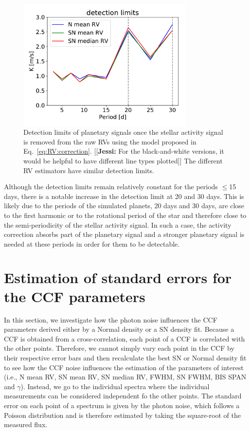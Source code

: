 \documentclass{aa}
\newcommand{\jessi}[1]{{\color{Purple}[[\textbf{Jessi: }#1]]}}
\begin{document}
\begin{figure}[!h]
\begin{center}
\includegraphics[height = 2.6in]{detection_limits.pdf} 
   \caption{Detection limits of planetary signals once the stellar activity signal is removed from the raw RVs using the model proposed in  Eq.~\ref{eq:RV:correction}. \jessi{For the black-and-white versions, it would be helpful to have different line types plotted}
The different RV estimators have similar detection limits.}
   \label{fig:detection_limits}
\end{center}
\end{figure}

Although the detection limits remain relatively constant for the periods  $\leq$15 days, there is a notable increase in the detection limit at 20 and 30 days. 
This is likely due to the periods of the simulated planets, 20 days and 30 days, are close to the first harmonic or to the rotational period of the star \citep[36.7 days,][]{Dumusque-2012}
and therefore close to the semi-periodicity of the stellar activity signal. In such a case, the activity 
correction absorbs part of the planetary signal and a stronger planetary signal is needed at these periods in order for them to be detectable.


\section{Estimation of standard errors for the CCF parameters} \label{sec:5}

In this section, we investigate how the photon noise influences the CCF parameters derived either by a Normal density or a SN density fit. 
Because a CCF is obtained from a cross-correlation, each point of a CCF is correlated with the other points. Therefore, we cannot simply vary each point in the CCF by their respective error bars and then recalculate the best SN or Normal density fit to see how the CCF noise influences the estimation of the parameters of interest (i.e., N mean RV, SN mean RV, SN median RV, FWHM, SN FWHM, BIS SPAN and $\gamma$). 
Instead, we go to the individual spectra where the individual measurements can be considered independent fo the other points.
The standard error on each point of a spectrum is given by the photon noise, which follows a Poisson distribution and is therefore estimated by taking the square-root of the measured flux.
\end{document}
